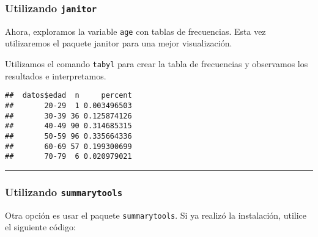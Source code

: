 \documentclass[
]{article}
\newenvironment{Shaded}{\begin{snugshade}}{\end{snugshade}}
\newcommand{\DataTypeTok}[1]{\textcolor[rgb]{0.13,0.29,0.53}{#1}}
\newcommand{\KeywordTok}[1]{\textcolor[rgb]{0.13,0.29,0.53}{\textbf{#1}}}
\newcommand{\NormalTok}[1]{#1}
\newcommand{\OperatorTok}[1]{\textcolor[rgb]{0.81,0.36,0.00}{\textbf{#1}}}
\newcommand{\StringTok}[1]{\textcolor[rgb]{0.31,0.60,0.02}{#1}}
\begin{document}
\hypertarget{utilizando-janitor}{%
\subsubsection{\texorpdfstring{Utilizando
\texttt{janitor}}{Utilizando janitor}}\label{utilizando-janitor}}

Ahora, exploramos la variable \texttt{age} con tablas de frecuencias.
Esta vez utilizaremos el paquete janitor para una mejor visualización.

Utilizamos el comando \texttt{tabyl} para crear la tabla de frecuencias
y observamos los resultados e interpretamos.

\begin{Shaded}
\end{Shaded}

\begin{verbatim}
##  datos$edad  n     percent
##       20-29  1 0.003496503
##       30-39 36 0.125874126
##       40-49 90 0.314685315
##       50-59 96 0.335664336
##       60-69 57 0.199300699
##       70-79  6 0.020979021
\end{verbatim}

\begin{center}\rule{0.5\linewidth}{0.5pt}\end{center}

\hypertarget{utilizando-summarytools}{%
\subsubsection{\texorpdfstring{Utilizando
\texttt{summarytools}}{Utilizando summarytools}}\label{utilizando-summarytools}}

Otra opción es usar el paquete \texttt{summarytools}. Si ya realizó la
instalación, utilice el siguiente código:

\begin{Shaded}
\end{Shaded}
\end{document}
